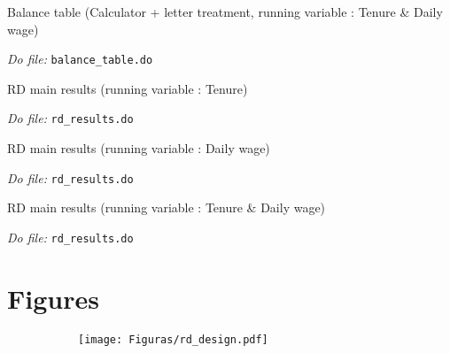 \documentclass[oneside,11pt]{article}
\begin{document}
\begin{landscape}
\begin{table}[H]
\caption{Balance table (Calculator + letter treatment, running variable : Tenure \& Daily wage)}
\label{balance_table_t3_tenuredw}
\begin{center}
\resizebox{1.5\textwidth}{!}{
\scriptsize{}
}
\end{center}
 \scriptsize 
\textit{Do file: } \texttt{balance\_table.do}
\end{table}

\end{landscape}


\begin{table}[H]
\caption{RD main results (running variable : Tenure)}
\label{rd_sett_1}
\begin{center}
\scriptsize{}
\end{center}
 \scriptsize 
\textit{Do file: } \texttt{rd\_results.do}
\end{table}

\begin{table}[H]
\caption{RD main results (running variable : Daily wage)}
\label{rd_sett_2}
\begin{center}
\scriptsize{}
\end{center}
 \scriptsize 
\textit{Do file: } \texttt{rd\_results.do}
\end{table}

\begin{table}[H]
\caption{RD main results (running variable : Tenure \& Daily wage)}
\label{rd_sett_3}
\begin{center}
\scriptsize{}
\end{center}
 \scriptsize 
\textit{Do file: } \texttt{rd\_results.do}
\end{table}


\section{Figures}


\begin{figure}[H]
     \caption{RD design}
    \label{rd_design}
\begin{center}
\begin{subfigure}{\textwidth}
        \texttt{[image: Figuras/rd\_design.pdf]}
    \end{subfigure}
  \end{center}
    \scriptsize 
\end{figure}
\end{document}
